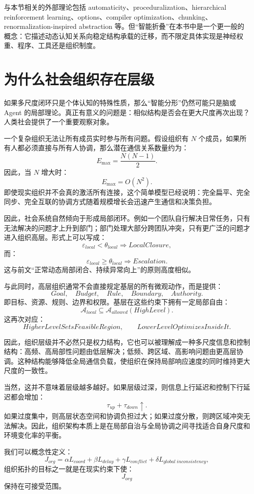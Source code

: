 与本节相关的外部理论包括 automaticity、proceduralization、hierarchical reinforcement learning、options、compiler optimization、chunking、renormalization-inspired abstraction 等。但“智能折叠”在本书中是一个更一般的概念：它描述动态认知关系向稳定结构承载的迁移，而不限定具体实现是神经权重、程序、工具还是组织制度。

\section{为什么社会组织存在层级}

如果多尺度闭环只是个体认知的特殊性质，那么“智能分形”仍然可能只是脑或 Agent 的局部理论。真正有意义的问题是：相似结构是否会在更大尺度再次出现？人类社会提供了一个重要观察对象。

一个复杂组织无法让所有成员实时参与所有问题。假设组织有 $N$ 个成员，如果所有人都必须直接与所有人协调，那么潜在通信关系数量约为：
\[
E_{\max}
=
\frac{N(N-1)}{2}.
\]
因此，当 $N$ 增大时：
\[
E_{\max}
=
O(N^2).
\]
即使现实组织并不会真的激活所有连接，这个简单模型已经说明：完全扁平、完全同步、完全互联的协调方式随着规模增长会迅速产生通信和决策负担。

因此，社会系统自然倾向于形成局部闭环。例如一个团队自行解决日常任务，只有无法解决的问题才上升到部门；部门处理大部分跨团队冲突，只有更广泛的问题才进入组织高层。形式上可以写成：
\[
\varepsilon_{local}
<
\theta_{local}
\Rightarrow
LocalClosure,
\]
而：
\[
\varepsilon_{local}
\geq
\theta_{local}
\Rightarrow
Escalation.
\]
这与前文“正常动态局部闭合、持续异常向上”的原则高度相似。

与此同时，高层组织通常不会直接规定基层的所有微观动作，而是提供：
\[
Goal,\quad Budget,\quad Rule,\quad Boundary,\quad Authority.
\]
即目标、资源、规则、边界和权限。基层在这些约束下拥有一定局部自由：
\[
\mathcal A_{local}
\subseteq
\mathcal A_{allowed}(HighLevel).
\]
这再次对应：
\[
HigherLevelSetsFeasibleRegion,
\qquad
LowerLevelOptimizesInsideIt.
\]

因此，组织层级并不必然只是权力结构，它也可以被理解成一种多尺度信息和控制结构：高频、高局部性问题由低层解决；低频、跨区域、高影响问题由更高层协调。这种结构能够降低全局通信负载，使组织在保持局部响应速度的同时维持更大尺度的一致性。

当然，这并不意味着层级越多越好。如果层级过深，则信息上行延迟和控制下行延迟都会增加：
\[
\tau_{up}+\tau_{down}
\uparrow.
\]
如果过度集中，则高层状态空间和协调负担过大；如果过度分散，则跨区域冲突无法解决。因此，组织架构本质上是在局部自治与全局协调之间寻找适合自身尺度和环境变化率的平衡。

我们可以概念性定义：
\[
J_{org}
=
\alpha L_{coord}
+
\beta L_{delay}
+
\gamma L_{conflict}
+
\delta L_{global\;inconsistency},
\]
组织拓扑的目标之一就是在现实约束下使：
\[
J_{org}
\]
保持在可接受范围。

